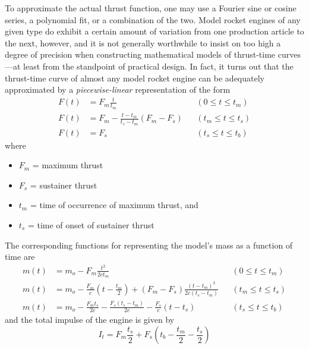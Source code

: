 To approximate the actual thrust function, one may use a Fourier sine or cosine series, a polynomial fit,
or a combination of the two. Model rocket engines of any given type do exhibit a certain amount of variation
from one production article to the next, however, and it is not generally worthwhile to insist on too high
a degree of precision when constructing mathematical models of thrust-time curves---at least from the
standpoint of practical design. In fact, it turns out that the thrust-time curve of almost any model rocket
engine can be adequately approximated by a \emph{piecewise-linear} representation of the form
\begin{subequations}\label{ch4:eq:73}
\begin{align}
F(t) &= F_m\frac{t}{t_m} && (0 \le t \le t_m) \label{ch4:eq:73a}\\
F(t) &= F_m - \frac{t - t_m}{t_s - t_m}(F_m - F_s) && (t_m \le t \le t_s) \label{ch4:eq:73b}\\
F(t) &= F_s && (t_s \le t \le t_b) \label{ch4:eq:73c}
\end{align}
\end{subequations}
where
\begin{itemize}[nosep,leftmargin=*,label={}]
  \item $F_m$ = maximum thrust
  \item $F_s$ = sustainer thrust
  \item $t_m$ = time of occurrence of maximum thrust, and
  \item $t_s$ = time of onset of sustainer thrust
\end{itemize}
The corresponding functions for representing the model's mass as a function of time are
\begin{subequations}\label{ch4:eq:74}
\begin{align}
m(t) &= m_o - F_m\frac{t^{2}}{2ct_m} && (0 \le t \le t_m) \label{ch4:eq:74a}\\
m(t) &= m_o - \frac{F_m}{c}\left(t - \frac{t_m}{2}\right) + (F_m - F_s)\frac{(t - t_m)^{2}}{2c(t_s - t_m)}
  && (t_m \le t \le t_s) \label{ch4:eq:74b}\\
m(t) &= m_o - \frac{F_m t_s}{2c} - \frac{F_s(t_s - t_m)}{2c} - \frac{F_s}{c}(t - t_s)
  && (t_s \le t \le t_b) \label{ch4:eq:74c}
\end{align}
\end{subequations}
and the total impulse of the engine is given by
\begin{equation}\label{ch4:eq:75}
I_t = F_m\frac{t_s}{2} + F_s\left(t_b - \frac{t_m}{2} - \frac{t_s}{2}\right)
\end{equation}
